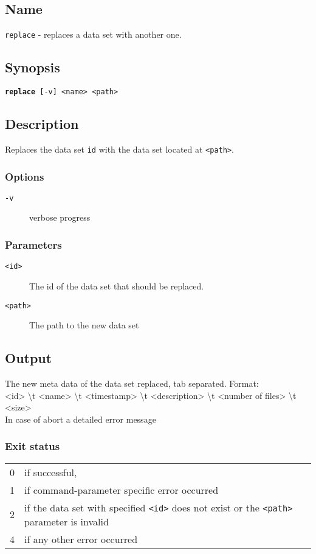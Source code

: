 \documentclass{article} %
\begin{document}
		\subsection*{Name}
		\texttt{replace} - replaces a data set with another one.
		\subsection*{Synopsis}
		\texttt{\textbf{replace} [-v] <name> <path>}
		\subsection*{Description}
		Replaces the data set \texttt{id} with the data set located at \texttt{<path>}.\\
		
		\noindent
		\subsubsection*{Options}
		\begin{description}
			\item[\texttt{-v}] verbose progress
		\end{description}
		
		\subsubsection*{Parameters}
		\begin{description}
			\item[\texttt{<id>}] The id of the data set that should be replaced.
			\item[\texttt{<path>}] The path to the new data set
		\end{description}
		\subsection*{Output}
		The new meta data of the data set replaced, tab separated. Format:\\<id> \textbackslash t <name> \textbackslash t <timestamp> \textbackslash t <description> \textbackslash t <number of files> \textbackslash t <size>\\
		In case of abort a detailed error message
		\subsubsection*{Exit status}
		\begin{tabular}{ll}
			0 &  if successful,\\ 
			1 &  if command-parameter specific error occurred\\
			2 &  if the data set with specified \texttt{<id>} does not exist or the \texttt{<path>} parameter is invalid\\
			4 &  if any other error occurred\\
		\end{tabular}
\end{document}
